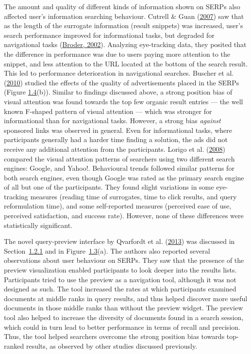 \documentclass[a4paper, nobind]{templates/ociamthesis}
\begin{document}
The amount and quality of different kinds of information shown on SERPs
also affected user's information searching behaviour. Cutrell \& Guan (\protect\hyperlink{ref-104}{2007}) saw that as
the length of the surrogate information (result snippets) was increased,
user's search performance improved for informational tasks, but degraded
for navigational tasks (\protect\hyperlink{ref-broder2002taxonomy}{Broder, 2002}). Analyzing eye-tracking
data, they posited that the difference in performance was due to users
paying more attention to the snippet, and less attention to the URL
located at the bottom of the search result. This led to performance
deterioration in navigational searches. Buscher et al. (\protect\hyperlink{ref-115}{2010}) studied the effects of the
quality of advertisements placed in the SERPs (Figure
\protect\hyperlink{fig_int_L_serp}{1.4}(b)). Similar to findings discussed above, a
strong position bias of visual attention was found towards the top few
organic result entries --- the well known F-shaped pattern of visual
attention --- which was stronger for informational than for navigational
tasks. However, a strong bias \emph{against} sponsored links was observed in
general. Even for informational tasks, where participants generally had
a harder time finding a solution, the ads did not receive any additional
attention from the participants. Lorigo et al. (\protect\hyperlink{ref-108}{2008}) compared the visual attention
patterns of searchers using two different search engines: Google, and
Yahoo!. Behavioural trends followed similar patterns for both search
engines, even though Google was rated as the primary search engine of
all but one of the participants. They found slight variations in some
eye-tracking measures (reading time of surrogates, time to click
results, and query reformulation time), and some self-reported measures
(perceived ease of use, perceived satisfaction, and success rate).
However, none of these differences were statistically significant.

The novel query-preview interface by Qvarfordt et al. (\protect\hyperlink{ref-121}{2013}) was discussed in
Section~\protect\hyperlink{sec:bg_search_query}{1.2.1} and in
Figure~\protect\hyperlink{fig_int_Q}{1.3}(a).
The authors also reported several observations about user behaviour on
SERPs. They saw that the presence of the preview visualization enabled
participants to look deeper into the results lists. Participants tried
to use the preview as a navigation tool, although it was not designed as
such. The tool increased the rates at which participants examined
documents at middle ranks in query results, and thus helped discover
more useful documents in those middle ranks than without the preview
widget. The preview tool also helped to increase the diversity of
documents found in a search session, which could in turn lead to better
performance in terms of recall and precision. Thus, the tool helped
searchers overcome the strong position bias towards top-ranked results,
as observed by other studies discussed previously.
\end{document}
